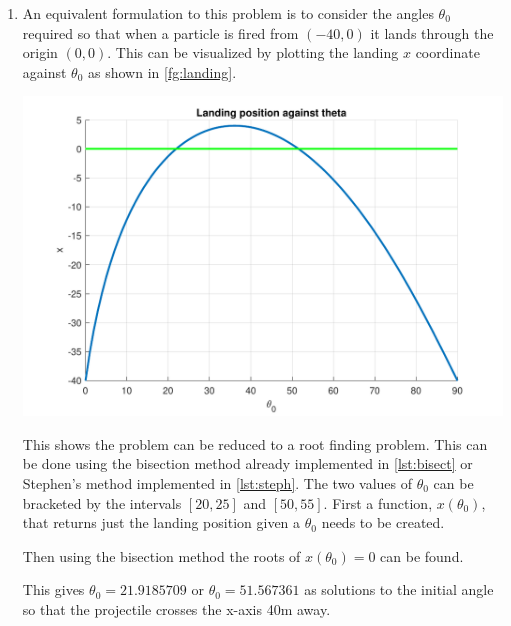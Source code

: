 \documentclass[a4paper,11pt]{article}
\begin{document}
\begin{enumerate}
	
	\item An equivalent formulation to this problem is to consider the angles 
	$\theta_{0}$ required so that when a particle is fired from $(-40,0)$ it 
	lands through the origin $(0,0)$. This can be visualized by plotting the 
	landing $x$ coordinate against $\theta_{0}$ as shown in 
	\autoref{fg:landing}.
	\begin{center}
		\includegraphics[scale=0.7]{images/Q3f.pdf}
		\label{fg:landing}
	\end{center}
	This shows the problem can be reduced to a root finding problem. This can 
	be done using the bisection method already implemented in 
	\autoref{lst:bisect} or Stephen's method implemented in 
	\autoref{lst:steph}. The two values of $\theta_{0}$ can be bracketed by 
	the 
	intervals $[20,25]$ and $[50,55]$. First a function, $x(\theta_{0})$, 
	that 
	returns just the 
	landing 
	position given a $\theta_{0}$ needs to be created.
	
	Then using the bisection method the roots of $x(\theta_{0}) = 0$ can be 
	found.
	
	This gives $\theta_{0} = 21.9185709$ or $\theta_{0} = 51.567361$ as 
	solutions to the initial angle so that the projectile crosses the x-axis 
	40m away.
\end{enumerate}
\end{document}
